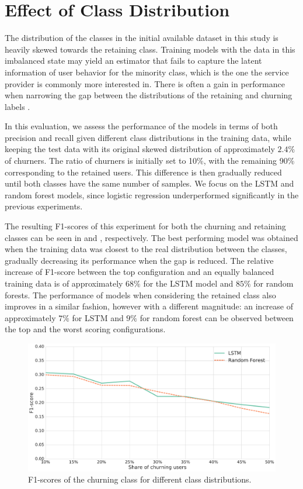 \documentclass{kththesis}
\begin{document}
\section{Effect of Class Distribution}
\label{sec:exp_class_dist}

The distribution of the classes in the initial available dataset in this study is heavily skewed towards the retaining class. Training models with the data in this imbalanced state may yield an estimator that fails to capture the latent information of user behavior for the minority class, which is the one the service provider is commonly more interested in. There is often a gain in performance when narrowing the gap between the distributions of the retaining and churning labels \cite{Burez2009}. 

In this evaluation, we assess the performance of the models in terms of both precision and recall given different class distributions in the training data, while keeping the test data with its original skewed distribution of approximately $2.4\%$ of churners. The ratio of churners is initially set to 10\%, with the remaining 90\% corresponding to the retained users. This difference is then gradually reduced until both classes have the same number of samples. We focus on the LSTM and random forest models, since logistic regression underperformed significantly in the previous experiments.

The resulting F1-scores of this experiment for both the churning and retaining classes can be seen in  and , respectively. The best performing model was obtained when the training data was closest to the real distribution between the classes, gradually decreasing its performance when the gap is reduced. The relative increase of F1-score between the top configuration and an equally balanced training data is of approximately $68\%$ for the LSTM model and $85\%$ for random forests. The performance of models when considering the retained class also improves in a similar fashion, however with a different magnitude: an increase of approximately $7\%$ for LSTM and $9\%$ for random forest can be observed between the top and the worst scoring configurations.

\begin{figure}[H]
    \centering
    \includegraphics[width=1.0\textwidth,keepaspectratio]{figures/line_class_balance.pdf}
    \caption{F1-scores of the churning class for different class distributions.}
    \label{fig:line_class_balance}
\end{figure}
\end{document}
